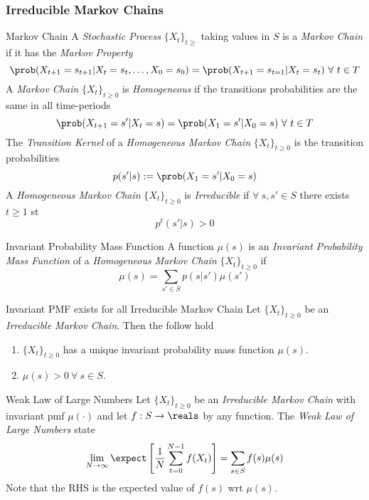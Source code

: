 \documentclass[11pt,a4paper]{article}
\begin{document}
\subsubsection{Irreducible Markov Chains} %

  \begin{definition}{Markov Chain}
    A \textit{Stochastic Process} $\{X_t\}_{t\geq}$ taking values in $S$ is a \textit{Markov Chain} if it has the \textit{Markov Property}
    \[ \prob(X_{t+1}=s_{t+1}|X_t=s_t,\dots,X_0=s_0)=\prob(X_{t+1}=s_{t=1}|X_t=s_t)\ \forall\ t\in T \]
    A \textit{Markov Chain} $\{X_t\}_{t\geq0}$ is \textit{Homogeneous} if the transitions probabilities are the same in all time-periods
    \[ \prob(X_{t+1}=s'|X_t=s)=\prob(X_1=s'|X_0=s)\ \forall\ t\in T \]
    The \textit{Transition Kernel} of a \textit{Homogeneous Markov Chain} $\{X_t\}_{t\geq0}$ is the transition probabilities
    \[ p(s'|s):=\prob(X_1=s'|X_0=s) \]
    A \textit{Homogeneous Markov Chain} $\{X_t\}_{t\geq0}$ is \textit{Irreducible} if $\forall\ s,s'\in S$ there exists $t\geq 1$ st
    \[ p^t(s'|s)>0 \]
  \end{definition}

  \begin{definition}{Invariant Probability Mass Function}
    A function $\mu(s)$ is an \textit{Invariant Probability Mass Function} of a \textit{Homogeneous Markov Chain} $\{X_t\}_{t\geq0}$ if
    \[ \mu(s)=\sum_{s'\in S}p(s|s')\mu(s') \]
  \end{definition}

  \begin{theorem}{Invariant PMF exists for all Irreducible Markov Chain}
    Let $\{X_t\}_{t\geq0}$ be an \textit{Irreducible Markov Chain}. Then the follow hold
    \begin{enumerate}
      \item $\{X_t\}_{t\geq0}$ has a unique invariant probability mass function $\mu(s)$.
      \item $\mu(s)>0\ \forall\ s\in S$.
    \end{enumerate}
  \end{theorem}

  \begin{theorem}{Weak Law of Large Numbers}
    Let $\{X_t\}_{t\geq0}$ be an \textit{Irreducible Markov Chain} with invariant pmf $\mu(\cdot)$ and let $f:S\to\reals$ by any function. The \textit{Weak Law of Large Numbers} state
    \[ \lim_{N\to\infty}\expect\left[\frac1N\sum_{t=0}^{N-1}f(X_t)\right]=\sum_{s\in S}f(s)\mu(s) \]
    Note that the RHS is the expected value of $f(s)$ wrt $\mu(s)$.
  \end{theorem}
\end{document}
